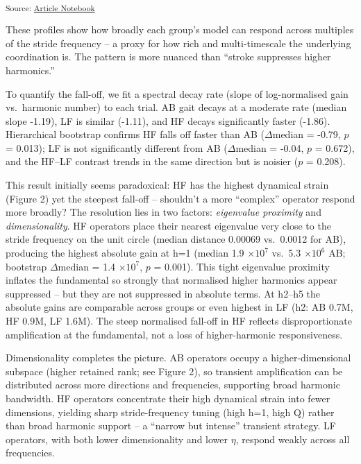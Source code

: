 \documentclass[
  letterpaper,
  DIV=11,
  numbers=noendperiod]{scrartcl}
\begin{document}
\textsubscript{Source:
\href{https://michaelhess17.github.io/Gait_NonNormality_Paper/index.qmd.html}{Article
Notebook}}

These profiles show how broadly each group's model can respond across
multiples of the stride frequency -- a proxy for how rich and
multi-timescale the underlying coordination is. The pattern is more
nuanced than ``stroke suppresses higher harmonics.''

To quantify the fall-off, we fit a spectral decay rate (slope of
log-normalised gain vs.~harmonic number) to each trial. AB gait decays
at a moderate rate (median slope -1.19), LF is similar (-1.11), and HF
decays significantly faster (-1.86). Hierarchical bootstrap confirms HF
falls off faster than AB (\(\Delta\)median = -0.79, \(p\) = 0.013); LF
is not significantly different from AB (\(\Delta\)median = -0.04, \(p\)
= 0.672), and the HF--LF contrast trends in the same direction but is
noisier (\(p\) = 0.208).

This result initially seems paradoxical: HF has the highest dynamical
strain (Figure 2) yet the steepest fall-off -- shouldn't a more
``complex'' operator respond more broadly? The resolution lies in two
factors: \emph{eigenvalue proximity} and \emph{dimensionality}. HF
operators place their nearest eigenvalue very close to the stride
frequency on the unit circle (median distance 0.00069 vs.~0.0012 for
AB), producing the highest absolute gain at h=1 (median 1.9
\(\times 10^7\) vs.~5.3 \(\times 10^6\) AB; bootstrap \(\Delta\)median =
1.4 \(\times 10^7\), \(p\) = 0.001). This tight eigenvalue proximity
inflates the fundamental so strongly that normalised higher harmonics
appear suppressed -- but they are not suppressed in absolute terms. At
h2--h5 the absolute gains are comparable across groups or even highest
in LF (h2: AB 0.7M, HF 0.9M, LF 1.6M). The steep normalised fall-off in
HF reflects disproportionate amplification at the fundamental, not a
loss of higher-harmonic responsiveness.

Dimensionality completes the picture. AB operators occupy a
higher-dimensional subspace (higher retained rank; see Figure 2), so
transient amplification can be distributed across more directions and
frequencies, supporting broad harmonic bandwidth. HF operators
concentrate their high dynamical strain into fewer dimensions, yielding
sharp stride-frequency tuning (high h=1, high Q) rather than broad
harmonic support -- a ``narrow but intense'' transient strategy. LF
operators, with both lower dimensionality and lower \(\eta\), respond
weakly across all frequencies.
\end{document}
